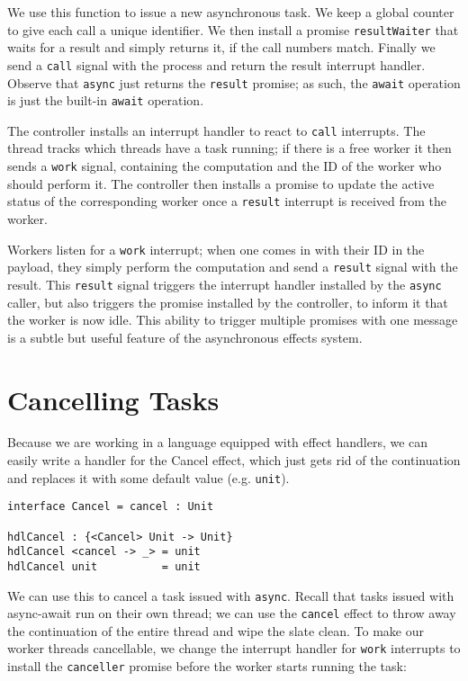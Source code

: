 \documentclass[msc,deptreport,cs]{infthesis} %
\newcommand{\code}[1]{\lstinline{#1}}
\begin{document}
We use this function to issue a new asynchronous task. We keep a global counter
to give each call a unique identifier. We then install a promise
\code{resultWaiter} that waits for a result and simply returns it, if the call
numbers match. Finally we send a \code{call} signal with the process and return
the result interrupt handler. Observe that \code{async} just returns the
\code{result} promise; as such, the \code{await} operation is just the built-in
\code{await} operation.

The controller installs an interrupt handler to react to \code{call} interrupts.
The thread tracks which threads have a task running; if there is a free worker
it then sends a \code{work} signal, containing the computation and the ID of the
worker who should perform it. The controller then installs a promise to update
the active status of the corresponding worker once a \code{result} interrupt is
received from the worker.

Workers listen for a \code{work} interrupt; when one comes in with their ID in
the payload, they simply perform the computation and send a \code{result} signal
with the result. This \code{result} signal triggers the interrupt handler
installed by the \code{async} caller, but also triggers the promise installed by
the controller, to inform it that the worker is now idle. This ability to
trigger multiple promises with one message is a subtle but useful feature of the
asynchronous effects system.

\section{Cancelling Tasks}

Because we are working in a language equipped with effect handlers, we can
easily write a handler for the \textsf{Cancel} effect, which just gets rid of
the continuation and replaces it with some default value (e.g. \code{unit}).

\begin{lstlisting}
interface Cancel = cancel : Unit

hdlCancel : {<Cancel> Unit -> Unit}
hdlCancel <cancel -> _> = unit
hdlCancel unit          = unit
\end{lstlisting}

\noindent We can use this to cancel a task issued with \code{async}. Recall that
tasks issued with async-await run on their own thread; we can use the
\code{cancel} effect to throw away the continuation of the entire thread and
wipe the slate clean. To make our worker threads cancellable, we change the
interrupt handler for \code{work} interrupts to install the \code{canceller}
promise before the worker starts running the task:
\end{document}
